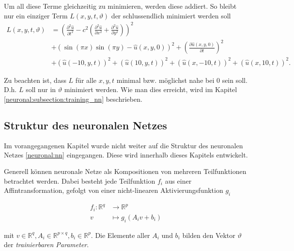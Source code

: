 Um all diese Terme gleichzeitig zu minimieren, werden diese addiert. So bleibt nur ein einziger Term \( L(x, y, t, \vartheta) \) der schlussendlich minimiert werden soll
\begin{equation}
    \begin{aligned}
        L(x, y, t, \vartheta) &= \left(\frac{\partial^2 \hat{u}}{\partial t^2} - c^2 \left( \frac{\partial^2 \hat{u}}{\partial x^2} + \frac{\partial^2 \hat{u}}{\partial y^2} \right)\right)^2\\
        &+ \left(\sin(\pi x) \sin(\pi y) - \hat{u}(x, y, 0)\right)^2
        + \left(\frac{\partial \hat{u}(x, y, 0)}{\partial t}\right)^2\\
        &+ \left(\hat{u}(-10, y, t)\right)^2
        + \left(\hat{u}(10, y, t)\right)^2
        + \left(\hat{u}(x, -10, t)\right)^2
        + \left(\hat{u}(x, 10, t)\right)^2.
    \end{aligned}
    \label{neuronal:optimierung}
\end{equation}

Zu beachten ist, dass \( L \) für alle \( x, y, t \) minimal bzw. möglichst nahe bei 0 sein soll.
D.h. \( L \) soll nur in \( \vartheta \) minimiert werden.
Wie man dies erreicht, wird im Kapitel \ref{neuronal:subsection:training_nn} beschrieben.

\subsection{Struktur des neuronalen Netzes}\label{neuronal:subsection:struktur_nn}

Im vorangegangenen Kapitel wurde nicht weiter auf die Struktur des neuronalen Netzes \eqref{neuronal:nn} eingegangen.
Diese wird innerhalb dieses Kapitels entwickelt.

Generell können neuronale Netze als Kompositionen von mehreren Teilfunktionen betrachtet werden.
Dabei besteht jede Teilfunktion \( f_i \) aus einer Affintransformation, gefolgt von einer nicht-linearen Aktivierungsfunktion \( g_i \)

\begin{align*}
    f_i\colon \mathbb{R}^q & \longrightarrow\mathbb{R}^p \\[-1ex]
    v & \longmapsto g_i(A_iv + b_i)
\end{align*}

mit \( v \in \mathbb{R}^q, A_i \in \mathbb{R}^{p \times q}, b_i \in \mathbb{R}^p \). 
Die Elemente aller \( A_i \) und \( b_i \) bilden den Vektor \( \vartheta \) der \emph{trainierbaren Parameter}.

